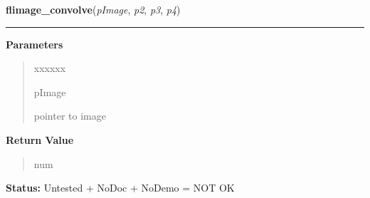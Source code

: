     \label{xformslib:flflimage:flimage_convolve}

    \vspace{0.5ex}

\hspace{.8\funcindent}\begin{boxedminipage}{\funcwidth}

    \raggedright \textbf{flimage\_convolve}(\textit{pImage}, \textit{p2}, \textit{p3}, \textit{p4})

    \vspace{-1.5ex}

    \rule{\textwidth}{0.5\fboxrule}
\setlength{\parskip}{2ex}
\setlength{\parskip}{1ex}
      \textbf{Parameters}
      \vspace{-1ex}

      \begin{quote}
        \begin{Ventry}{xxxxxx}

          \item[pImage]

          pointer to image

        \end{Ventry}

      \end{quote}

      \textbf{Return Value}
    \vspace{-1ex}

      \begin{quote}
      num

      \end{quote}

\textbf{Status:} Untested + NoDoc + NoDemo = NOT OK



    \end{boxedminipage}

    \label{xformslib:flflimage:flimage_convolvea}

    \vspace{0.5ex}

